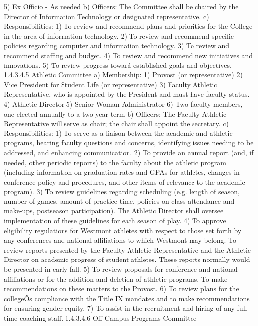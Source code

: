 \documentclass[letterpaper, 11pt]{article}
\begin{document}
			5) Ex Officio - As needed
			b) Officers:
			The Committee shall be chaired by the Director of Information Technology or designated representative.
			c) Responsibilities:
			1) To review and recommend plans and priorities for the College in the area of information technology.
			2) To review and recommend specific policies regarding computer and information technology.
			3) To review and recommend staffing and budget.
			4) To review and recommend new initiatives and innovations.
			5) To review progress toward established goals and objectives.
			1.4.3.4.5 Athletic Committee
			a) Membership:
			1) Provost (or representative)
			2) Vice President for Student Life (or representative)
			3) Faculty Athletic Representative, who is appointed by the President and must have faculty status.
			4) Athletic Director
			5) Senior Woman Administrator
			6) Two faculty members, one elected annually to a two-year term
			b) Officers:
			The Faculty Athletic Representative will serve as chair; the chair shall appoint the secretary.
			c) Responsibilities:
			1) To serve as a liaison between the academic and athletic programs, hearing faculty questions and concerns, identifying issues needing to be addressed, and enhancing communication.
			2) To provide an annual report (and, if needed, other periodic reports) to the faculty about the athletic program (including information on graduation rates and GPAs for athletes, changes in conference policy and procedures, and other items of relevance to the academic program).
			3) To review guidelines regarding scheduling (e.g. length of season, number of games, amount of practice time, policies on class attendance and make-ups, postseason participation).  The Athletic Director shall oversee implementation of these guidelines for each season of play.
			4) To approve eligibility regulations for Westmont athletes with respect to those set forth by any conferences and national affiliations to which Westmont may belong.  To review reports presented by the Faculty Athletic Representative and the Athletic Director on academic progress of student athletes.  These reports normally would be presented in early fall.
			5) To review proposals for conference and national affiliations or for the addition and deletion of athletic programs.  To make recommendations on these matters to the Provost.
			6) To review plans for the collegeÕs compliance with the Title IX mandates and to make recommendations for ensuring gender equity.
			7) To assist in the recruitment and hiring of any full-time coaching staff.
			1.4.3.4.6 Off-Campus Programs Committee
\end{document}
